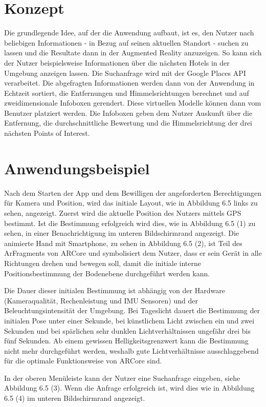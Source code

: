 \section{Konzept}

Die grundlegende Idee, auf der die Anwendung aufbaut, ist es, den Nutzer nach beliebigen Informationen - in Bezug auf seinen aktuellen Standort - suchen zu lassen und die Resultate dann in der Augmented Reality anzuzeigen. So kann sich der Nutzer beispielsweise Informationen über die nächsten Hotels in der Umgebung anzeigen lassen. Die Suchanfrage wird mit der Google Places API verarbeitet. Die abgefragten Informationen werden dann von der Anwendung in Echtzeit sortiert, die Entfernungen und Himmelsrichtungen berechnet und auf zweidimensionale Infoboxen gerendert. Diese virtuellen Modelle können dann vom Benutzer platziert werden. Die Infoboxen geben dem Nutzer Auskunft über die Entfernung, die durchschnittliche Bewertung und die Himmelsrichtung der drei nächsten Points of Interest.

\section{Anwendungsbeispiel}

Nach dem Starten der App und dem Bewilligen der angeforderten Berechtigungen für Kamera und Position, wird das initiale Layout, wie in Abbildung 6.5 links zu sehen, angezeigt. Zuerst wird die aktuelle Position des Nutzers mittels GPS bestimmt. Ist die Bestimmung erfolgreich wird dies, wie in Abbildung 6.5 (1) zu sehen, in einer Benachrichtigung im unteren Bildschirmrand angezeigt. Die animierte Hand mit Smartphone, zu sehen in Abbildung 6.5 (2), ist Teil des ArFragments von ARCore und symbolisiert dem Nutzer, dass er sein Gerät in alle Richtungen drehen und bewegen soll, damit die initiale interne Positionsbestimmung der Bodenebene durchgeführt werden kann. 

Die Dauer dieser initialen Bestimmung ist abhängig von der Hardware (Kameraqualität, Rechenleistung und IMU Sensoren) und der Beleuchtungsintensität der Umgebung. Bei Tageslicht dauert die Bestimmung der initialen Pose unter einer Sekunde, bei künstlichem Licht zwischen ein und zwei Sekunden und bei spärlichen sehr dunklen Lichtverhältnissen ungefähr drei bis fünf Sekunden. Ab einem gewissen Helligkeitsgrenzwert kann die Bestimmung nicht mehr durchgeführt werden, weshalb gute Lichtverhältnisse ausschlaggebend für die optimale Funktionsweise von ARCore sind.

In der oberen Menüleiste kann der Nutzer eine Suchanfrage eingeben, siehe Abbildung 6.5 (3). Wenn die Anfrage erfolgreich ist, wird dies wie in Abbildung 6.5 (4) im unteren Bildschirmrand angezeigt. 

